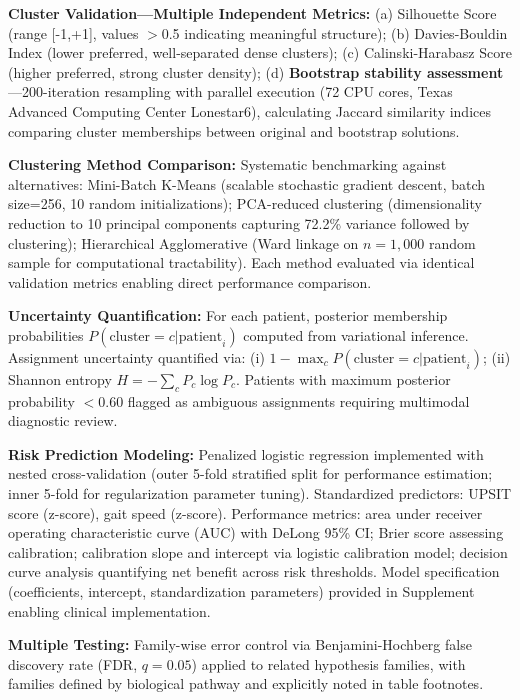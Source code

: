 \documentclass[11pt]{article}
\begin{document}
\textbf{Cluster Validation—Multiple Independent Metrics:} (a) Silhouette Score (range [-1,+1], values $>$0.5 indicating meaningful structure); (b) Davies-Bouldin Index (lower preferred, well-separated dense clusters); (c) Calinski-Harabasz Score (higher preferred, strong cluster density); (d) \textbf{Bootstrap stability assessment}—200-iteration resampling with parallel execution (72 CPU cores, Texas Advanced Computing Center Lonestar6), calculating Jaccard similarity indices comparing cluster memberships between original and bootstrap solutions.

\textbf{Clustering Method Comparison:} Systematic benchmarking against alternatives: Mini-Batch K-Means (scalable stochastic gradient descent, batch size=256, 10 random initializations); PCA-reduced clustering (dimensionality reduction to 10 principal components capturing 72.2\% variance followed by clustering); Hierarchical Agglomerative (Ward linkage on $n=1,000$ random sample for computational tractability). Each method evaluated via identical validation metrics enabling direct performance comparison.

\textbf{Uncertainty Quantification:} For each patient, posterior membership probabilities $P(\text{cluster}=c|\text{patient}_i)$ computed from variational inference. Assignment uncertainty quantified via: (i) $1 - \max_c P(\text{cluster}=c|\text{patient}_i)$; (ii) Shannon entropy $H = -\sum_c P_c \log P_c$. Patients with maximum posterior probability $<$0.60 flagged as ambiguous assignments requiring multimodal diagnostic review.

\textbf{Risk Prediction Modeling:} Penalized logistic regression implemented with nested cross-validation (outer 5-fold stratified split for performance estimation; inner 5-fold for regularization parameter tuning). Standardized predictors: UPSIT score (z-score), gait speed (z-score). Performance metrics: area under receiver operating characteristic curve (AUC) with DeLong 95\% CI; Brier score assessing calibration; calibration slope and intercept via logistic calibration model; decision curve analysis quantifying net benefit across risk thresholds. Model specification (coefficients, intercept, standardization parameters) provided in Supplement enabling clinical implementation.

\textbf{Multiple Testing:} Family-wise error control via Benjamini-Hochberg false discovery rate (FDR, $q=0.05$) applied to related hypothesis families, with families defined by biological pathway and explicitly noted in table footnotes.
\end{document}
